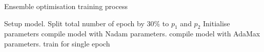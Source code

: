 \begin{algorithm}
    \caption{Ensemble optimisation training process}
        \begin{algorithmic}[1]
            \STATE Setup model. Split total number of epoch by 30\% to $p_{1}$ and $p_{2}$
            \STATE Initialise parameters
                    \STATE compile model with Nadam parameters. 
                \ELSE
                    \STATE compile model with AdaMax parameters. 
                \ENDIF
                \STATE train for single epoch
            \ENDWHILE
        \end{algorithmic}
    \label{alg:ENS}
\end{algorithm}
